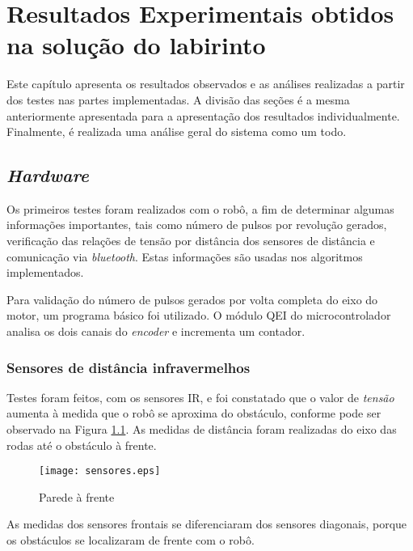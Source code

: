 \chapter{\textbf{Resultados Experimentais obtidos na solução do labirinto}}\label{Resultados}


Este capítulo apresenta os resultados observados e as análises realizadas a partir dos testes nas partes implementadas. A divisão das seções é a mesma anteriormente apresentada para a apresentação dos resultados individualmente. Finalmente, é realizada uma análise geral do sistema como um todo.

\section{\textit{Hardware}}
Os primeiros testes foram realizados com o robô, a fim de determinar algumas informações importantes, tais como número de pulsos por revolução gerados, verificação das relações de tensão por distância dos sensores de distância e comunicação via \textit{bluetooth}. Estas informações são usadas nos algoritmos implementados.

Para validação do número de pulsos gerados por volta completa do eixo do motor, um programa básico foi utilizado. O módulo QEI do microcontrolador analisa os dois canais do \textit{encoder} e incrementa um contador.

\subsection{Sensores de distância infravermelhos}
Testes foram feitos, com os sensores IR, e foi constatado que o valor de \emph{tensão} aumenta à medida que o robô se aproxima do obstáculo, conforme pode ser observado na Figura \ref{fig:IR_frontal}. As medidas de distância foram realizadas do eixo das rodas até o obstáculo à frente.

\begin{figure}[!htb]
	\caption{\label{fig:IR_frontal}Parede à frente}
	\begin{center}
		\texttt{[image: sensores.eps]}
	\end{center}
\end{figure}

As medidas dos sensores frontais se diferenciaram dos sensores diagonais, porque os obstáculos se localizaram de frente com o robô.

